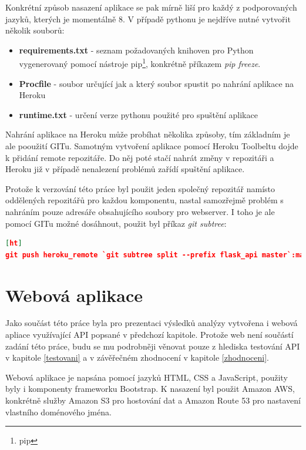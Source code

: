 \documentclass[thesis=B,czech]{FITthesis}[2012/06/26]
\begin{document}
Konkrétní způsob nasazení aplikace se pak mírně liší pro každý z podporovaných jazyků, kterých je momentálně 8. V případě pythonu je nejdříve nutné vytvořit několik souborů:

\begin{itemize}
\item \textbf{requirements.txt} - seznam požadovaných knihoven pro Python vygenerovaný pomocí nástroje pip\footnote{pip}, konkrétně příkazem \textit{pip freeze}.
\item \textbf{Procfile} - soubor určující jak a který soubor spustit po nahrání aplikace na Heroku
\item \textbf{runtime.txt} - určení verze pythonu použité pro spuštění aplikace
\end{itemize}

Nahrání aplikace na Heroku může probíhat několika způsoby, tím základním je ale pooužití GITu. Samotným vytvoření aplikace pomocí Heroku Toolbeltu dojde k přidání remote repozitáře. Do něj poté stačí nahrát změny v repozitáři a Heroku již v případě nenalezení problémů zařídí spuštění aplikace. 

Protože k verzování této práce byl použit jeden společný repozitář namísto oddělených repozitářů pro každou komponentu, nastal samozřejmě problém s nahráním pouze adresáře obsahujícího soubory pro webserver. I toho je ale pomocí GITu možné dosáhnout, použit byl příkaz \textit{git subtree}:


\begin{lstlisting}[language=json,firstnumber=1][ht]
git push heroku_remote `git subtree split --prefix flask_api master`:master --force
\end{lstlisting}



\section{Webová aplikace}
	Jako součást této práce byla pro prezentaci výsledků analýzy vytvořena i webová apliace využívající API popsané v předchozí kapitole. Protože web není součástí zadání této práce, budu se mu podrobněji věnovat pouze z hlediska testování API v kapitole \ref{testovani} a v závěřečném zhodnocení v kapitole \ref{zhodnoceni}. 
	
	Webová aplikace je napsána pomocí jazyků HTML, CSS a JavaScript, použity byly i komponenty frameworku Bootstrap. K nasazení byl použit Amazon AWS, konkrétně služby Amazon S3 pro hostování dat a Amazon Route 53 pro nastavení vlastního doménového jména. 
\end{document}

